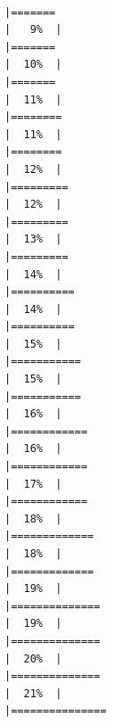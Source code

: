 \documentclass[
  ignorenonframetext,
]{beamer}
\begin{document}
\begin{frame}[fragile]{}
\begin{verbatim}
                                                                          |=======                                                               |   9%  |                                                                              |=======                                                               |  10%  |                                                                              |=======                                                               |  11%  |                                                                              |========                                                              |  11%  |                                                                              |========                                                              |  12%  |                                                                              |=========                                                             |  12%  |                                                                              |=========                                                             |  13%  |                                                                              |=========                                                             |  14%  |                                                                              |==========                                                            |  14%  |                                                                              |==========                                                            |  15%  |                                                                              |===========                                                           |  15%  |                                                                              |===========                                                           |  16%  |                                                                              |============                                                          |  16%  |                                                                              |============                                                          |  17%  |                                                                              |============                                                          |  18%  |                                                                              |=============                                                         |  18%  |                                                                              |=============                                                         |  19%  |                                                                              |==============                                                        |  19%  |                                                                              |==============                                                        |  20%  |                                                                              |==============                                                        |  21%  |                                                                              |===============                                            
\end{verbatim}
\end{frame}
\end{document}
